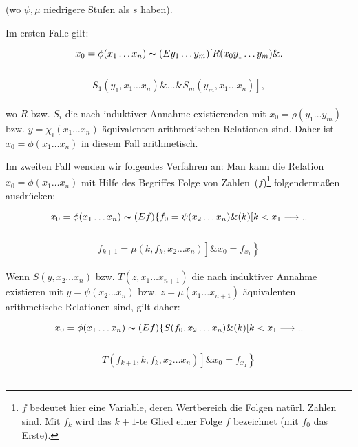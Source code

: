 \documentclass[draft]{scrartcl}
\begin{document}
(wo $\psi, \mu$ niedrigere Stufen als $s$ haben).

Im ersten Falle gilt:

$$
x_0 = \phi\left(x_1 \dots x_n\right) \thicksim \left(Ey_1 \dots y_m\right) \left[R\left(x_0 y_1 \dots y_m\right) \& \right.
$$\\[\spacebetweenbreakedequations]
$$\left.S_1\left(y_1, x_1 \dots x_n\right) \& \dots \& S_m\left(y_m, x_1 \dots x_n\right)\right],
$$\\[\spaceafterbreakedequation]

wo $R$ bzw. $S_i$ die nach induktiver Annahme existierenden mit $x_0 = \rho\left(y_1 \dots y_m\right)$ bzw. 
$y = \chi_i\left(x_1 \dots x_n\right)$ äquivalenten arithmetischen
Relationen sind. Daher ist $x_0 = \phi\left(x_1\dots x_n\right)$ in
diesem Fall arithmetisch.

Im zweiten Fall wenden wir folgendes Verfahren an: Man 
kann die Relation $x_0 = \phi\left(x_1 \dots x_n\right)$ mit Hilfe des Begriffes \glqq Folge von Zahlen\grqq\ 
($f$)\footnote{$f$ bedeutet hier eine Variable, deren Wertbereich die Folgen natürl. Zahlen sind. Mit $f_k$ wird das $k + 1$-te Glied einer Folge $f$ bezeichnet (mit $f_0$ das Erste).}
folgendermaßen ausdrücken:

$$
x_0 = \phi\left(x_1 \dots x_n\right) \thicksim \left(Ef\right)\left\{ f_0 = \psi\left(x_2 \dots x_n\right) \& \left(k\right) \left[k < x_1 \longrightarrow\right.\right.
$$\\[\spacebetweenbreakedequations]
$$\left.\left. f_{k + 1} = \mu\left(k, f_k, x_2 \dots x_n\right)\right] \& x_0 = f_{x_1}\right\}
$$\\[\spaceafterbreakedequation]

Wenn $S\left(y, x_2 \dots x_n\right)$ bzw. $T\left(z, x_1 \dots x_{n + 1}\right)$ die 
nach induktiver Annahme existieren mit $y = \psi\left(x_2 \dots x_n\right)$ bzw. 
$z = \mu\left(x_1 \dots x_{n + 1}\right)$ äquivalenten arithmetische Relationen sind, gilt daher:

\begin{equation}
x_0 = \phi\left(x_1 \dots x_n\right) \thicksim \left(Ef\right) \left\{S\left(f_0, x_2 \dots x_n\right) \& \left(k\right)\left[k < x_1 \longrightarrow \right.\right.
\end{equation}\\[\spacebetweenbreakedequations]
\begin{equation*}
\left.\left.T\left(f_{k + 1}, k, f_k, x_2 \dots x_n\right)\right] \& x_0 = f_{x_1}\right\}
\end{equation*}\\[\spaceafterbreakedequation]
\end{document}
